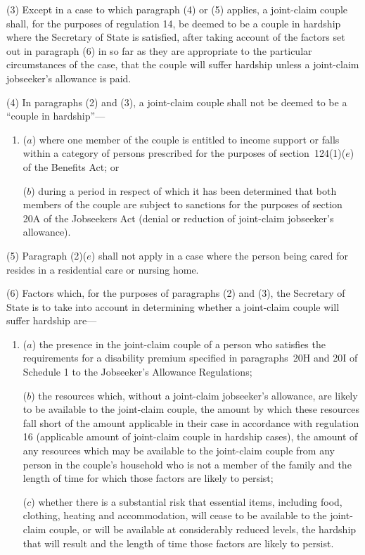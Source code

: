 \documentclass[12pt,a4paper]{article}
\begin{document}
(3) Except in a case to which paragraph (4) or (5) applies, a joint-claim couple shall, for the purposes of regulation 14, be deemed to be a couple in hardship where the Secretary of State is satisfied, after taking account of the factors set out in paragraph (6) in so far as they are appropriate to the particular circumstances of the case, that the couple will suffer hardship unless a joint-claim jobseeker’s allowance is paid.

(4) In paragraphs (2) and (3), a joint-claim couple shall not be deemed to be a “couple in hardship”—
\begin{enumerate}\item[]
($a$) where one member of the couple is entitled to income support or falls within a category of persons prescribed for the purposes of section~124(1)($e$)  of the Benefits Act; or

($b$) during a period in respect of which it has been determined that both members of the couple are subject to sanctions for the purposes of section 20A of the Jobseekers Act (denial or reduction of joint-claim jobseeker’s allowance).
\end{enumerate}

(5) Paragraph (2)($e$)  shall not apply in a case where the person being cared for resides in a residential care or nursing home.

(6) Factors which, for the purposes of paragraphs (2) and (3), the Secretary of State is to take into account in determining whether a joint-claim couple will suffer hardship are—
\begin{enumerate}\item[]
($a$) the presence in the joint-claim couple of a person who satisfies the requirements for a disability premium specified in paragraphs~20H and 20I of Schedule 1 to the Jobseeker’s Allowance Regulations;

($b$) the resources which, without a joint-claim jobseeker’s allowance, are likely to be available to the joint-claim couple, the amount by which these resources fall short of the amount applicable in their case in accordance with regulation 16 (applicable amount of joint-claim couple in hardship cases), the amount of any resources which may be available to the joint-claim couple from any person in the couple’s household who is not a member of the family and the length of time for which those factors are likely to persist;

($c$) whether there is a substantial risk that essential items, including food, clothing, heating and accommodation, will cease to be available to the joint-claim couple, or will be available at considerably reduced levels, the hardship that will result and the length of time those factors are likely to persist.
\end{enumerate}
\end{document}
